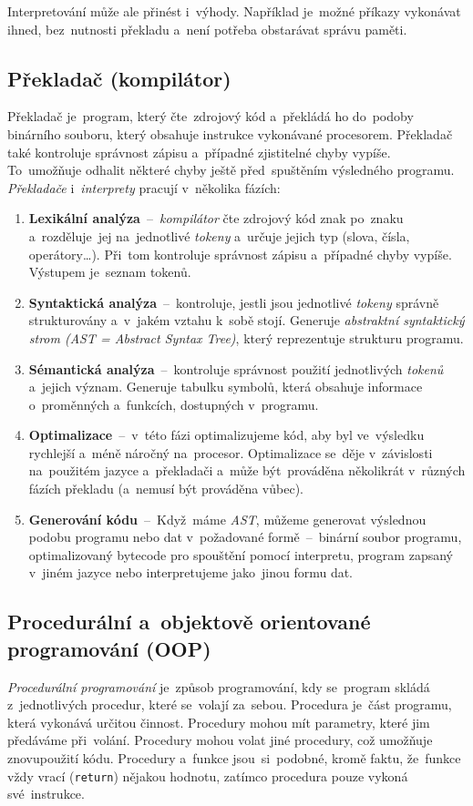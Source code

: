 \documentclass[10pt,a4paper]{article}
\begin{document}
            Interpretování může ale přinést i~výhody. Například je~možné příkazy vykonávat ihned, bez~nutnosti překladu a~není potřeba obstarávat správu paměti. \cite{ueda:compiled}
        
        \subsection{Překladač (kompilátor)}
            Překladač je~program, který čte~zdrojový kód a~překládá ho do~podoby binárního souboru, který obsahuje instrukce vykonávané procesorem. Překladač také kontroluje správnost zápisu a~případné zjistitelné chyby vypíše. To~umožňuje odhalit některé chyby ještě před~spuštěním výsledného programu.
            \emph{Překladače} i~\emph{interprety} pracují v~několika fázích:
            \begin{enumerate}
                \item \textbf{Lexikální analýza}~--~\emph{kompilátor} čte zdrojový kód znak po~znaku a~rozděluje~jej na~jednotlivé \emph{tokeny} a~určuje jejich typ (slova, čísla, operátory\dots). Při~tom kontroluje správnost zápisu a~případné chyby vypíše. Výstupem je~seznam tokenů.
                \item \textbf{Syntaktická analýza}~--~kontroluje, jestli jsou jednotlivé \emph{tokeny} správně strukturovány a~v~jakém vztahu k~sobě stojí. Generuje \emph{abstraktní syntaktický strom (AST = Abstract Syntax Tree)}, který reprezentuje strukturu programu.
                \item \textbf{Sémantická analýza}~--~kontroluje správnost použití jednotlivých \emph{tokenů} a~jejich význam. Generuje tabulku symbolů, která obsahuje informace o~proměnných a~funkcích, dostupných v~programu.
                \item \textbf{Optimalizace}~--~v~této fázi optimalizujeme kód, aby byl ve~výsledku rychlejší a~méně náročný na~procesor. Optimalizace se~děje v~závislosti na~použitém jazyce a~překladači a~může být~prováděna několikrát v~různých fázích překladu (a~nemusí být prováděna vůbec).
                \item \textbf{Generování kódu}~--~Když~máme \emph{AST}, můžeme generovat výslednou podobu programu nebo dat v~požadované formě~--~binární soubor programu, optimalizovaný bytecode pro spouštění pomocí interpretu, program zapsaný v~jiném jazyce nebo interpretujeme jako~jinou formu dat.
            \end{enumerate} \cite{baeldungCompilersWork}

        \subsection{Procedurální a~objektově orientované programování (OOP)}
            \emph{Procedurální programování} je~způsob programování, kdy se~program skládá z~jednotlivých procedur, které se~volají za~sebou. Procedura je~část programu, která vykonává určitou činnost. Procedury mohou mít parametry, které jim předáváme při~volání. Procedury mohou volat jiné procedury, což umožňuje znovupoužití kódu. Procedury a~funkce jsou~si~podobné, kromě faktu, že~funkce vždy vrací (\texttt{return}) nějakou hodnotu, zatímco procedura pouze vykoná své~instrukce.
            
\end{document}
